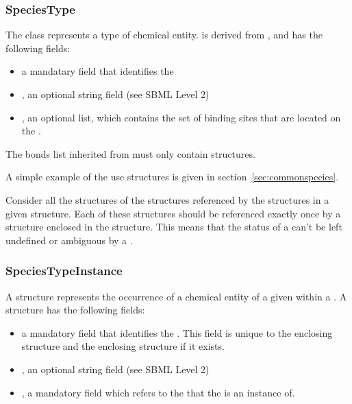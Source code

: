 \documentclass{cekarticle}
\begin{document}
\subsubsection{SpeciesType}

The class  represents a type of chemical
entity.  is derived from ,
and has the following fields:

\begin{itemize}

\item {} a mandatary  field that identifies the 

\item {}, an optional string field (see SBML Level 2)

\item {}, an optional  list, which contains the set of binding
sites that are located on the .

\end{itemize}

The bonds list inherited from  must only
contain  structures.

A simple example of the use  structures is given in section~\ref{sec:commonspecies}.

Consider all the  structures of the
 structures referenced by the
 structures in a given
 structure. Each of these 
structures should be referenced exactly once by a
 structure enclosed in the 
structure.  This means that the status of a 
can't be left undefined or ambiguous by a .

\subsubsection{SpeciesTypeInstance}

A  structure represents the occurrence of a chemical entity of a given
 within a .  A  structure has the
following fields:

\begin{itemize}

\item {} a mandatory  field that identifies the .
This field is unique to the enclosing  structure and the enclosing
 structure if it exists.

\item {}, an optional string field (see SBML Level 2)

\item {}, a mandatory  field which refers to the 
that the  is an instance of.

\end{itemize}
\end{document}

